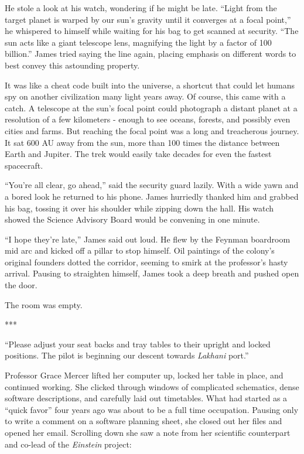 \documentclass[12pt]{article} %
\begin{document}
He stole a look at his watch, wondering if he might be late. ``Light from the target planet is warped by our sun's gravity until it converges at a focal point,'' he whispered to himself while waiting for his bag to get scanned at security. ``The sun acts like a giant telescope lens, magnifying the light by a factor of 100 billion.'' James tried saying the line again, placing emphasis on different words to best convey this astounding property.

It was like a cheat code built into the universe, a shortcut that could let humans spy on another civilization many light years away. Of course, this came with a catch. A telescope at the sun's focal point could photograph a distant planet at a resolution of a few kilometers - enough to see oceans, forests, and possibly even cities and farms. But reaching the focal point was a long and treacherous journey. It sat 600 AU away from the sun, more than 100 times the distance between Earth and Jupiter. The trek would easily take decades for even the fastest spacecraft.

``You're all clear, go ahead,'' said the security guard lazily. With a wide yawn and a bored look he returned to his phone. James hurriedly thanked him and grabbed his bag, tossing it over his shoulder while zipping down the hall. His watch showed the Science Advisory Board would be convening in one minute.

``I hope they're late,'' James said out loud. He flew by the Feynman boardroom mid arc and kicked off a pillar to stop himself. Oil paintings of the colony's original founders dotted the corridor, seeming to smirk at the professor's hasty arrival. Pausing to straighten himself, James took a deep breath and pushed open the door.

The room was empty.

\begin{center}
***
\end{center}

``Please adjust your seat backs and tray tables to their upright and locked positions. The pilot is beginning our descent towards \textit{Lakhani} port.''

Professor Grace Mercer lifted her computer up, locked her table in place, and continued working. She clicked through windows of complicated schematics, dense software descriptions, and carefully laid out timetables. What had started as a ``quick favor'' four years ago was about to be a full time occupation. Pausing only to write a comment on a software planning sheet, she closed out her files and opened her email. Scrolling down she saw a note from her scientific counterpart and co-lead of the \textit{Einstein} project:
\end{document}
